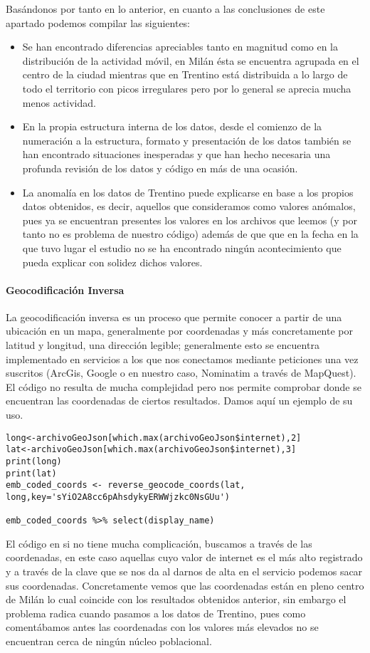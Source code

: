 \documentclass[11pt, a4paper]{article} %
\begin{document}
Basándonos por tanto en lo anterior, en cuanto a las conclusiones de este apartado podemos compilar las siguientes:
\begin{itemize}
\item Se han encontrado diferencias apreciables tanto en magnitud como en la distribución de la actividad móvil, en Milán ésta se encuentra agrupada en el centro de la ciudad mientras que en Trentino está distribuida a lo largo de todo el territorio con picos irregulares pero por lo general se aprecia mucha menos actividad.
\item En la propia estructura interna de los datos, desde el comienzo de la numeración a la estructura, formato y presentación de los datos también se han encontrado situaciones inesperadas y que han hecho necesaria una profunda revisión de los datos y código en más de una ocasión.
\item La anomalía en los datos de Trentino puede explicarse en base a los propios datos obtenidos, es decir, aquellos que consideramos como valores anómalos, pues ya se encuentran presentes los valores en los archivos que leemos (y por tanto no es problema de nuestro código) además de que que en la fecha en la que tuvo lugar el estudio no se ha encontrado ningún acontecimiento que pueda explicar con solidez dichos valores.
\end{itemize}
\paragraph{Geocodificación Inversa}
La geocodificación inversa es un proceso que permite conocer a partir de una ubicación en un mapa, generalmente por coordenadas y más concretamente por latitud y longitud, una dirección legible; generalmente esto se encuentra implementado en servicios a los que nos conectamos mediante peticiones una vez suscritos (ArcGis, Google o en nuestro caso, Nominatim a través de MapQuest).
El código no resulta de mucha complejidad pero nos permite comprobar donde se encuentran las coordenadas de ciertos resultados. Damos aquí un ejemplo de su uso.
\begin{lstlisting}
long<-archivoGeoJson[which.max(archivoGeoJson$internet),2]
lat<-archivoGeoJson[which.max(archivoGeoJson$internet),3]
print(long)
print(lat)
emb_coded_coords <- reverse_geocode_coords(lat, long,key='sYiO2A8cc6pAhsdykyERWWjzkc0NsGUu')

emb_coded_coords %>% select(display_name)
\end{lstlisting}
El código en si no tiene mucha complicación, buscamos a través de las coordenadas, en este caso aquellas cuyo valor de internet es el más alto registrado y a través de la clave que se nos da al darnos de alta en el servicio podemos sacar sus coordenadas. Concretamente vemos que las coordenadas están en pleno centro de Milán lo cual coincide con los resultados obtenidos anterior, sin embargo el problema radica cuando pasamos a los datos de Trentino, pues como comentábamos antes las coordenadas con los valores más elevados no se encuentran cerca de ningún núcleo poblacional.
\end{document}
